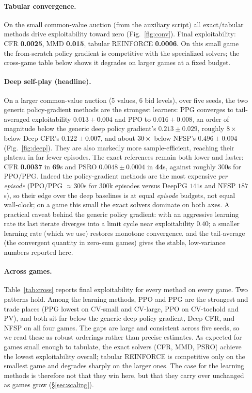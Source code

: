 \documentclass[11pt,a4paper]{article}
\begin{document}
\paragraph{Tabular convergence.} On the small common-value auction (from the
auxiliary script) all exact/tabular methods drive exploitability toward zero
(Fig.~\ref{fig:conv}). Final exploitability: CFR \textbf{0.0025}, MMD \textbf{0.015},
tabular REINFORCE \textbf{0.0006}. On this small game the from-scratch policy
gradient is competitive with the specialized solvers; the cross-game table below
shows it degrades on larger games at a fixed budget.

\paragraph{Deep self-play (headline).} On a larger common-value auction (5 values,
6 bid levels), over five seeds, the two generic policy-gradient methods are the
strongest learners: PPG converges to tail-averaged exploitability
\textbf{$0.013 \pm 0.004$} and PPO to \textbf{$0.016 \pm 0.008$}, an order of
magnitude below the generic deep policy gradient's \textbf{$0.213 \pm 0.029$},
roughly $8\times$ below Deep CFR's \textbf{$0.122 \pm 0.007$}, and about $30\times$
below NFSP's \textbf{$0.496 \pm 0.004$} (Fig.~\ref{fig:deep}). They are also markedly
more sample-efficient, reaching their plateau in far fewer episodes. The exact
references remain both lower and faster: CFR \textbf{0.0037} in \textbf{69}s and PSRO
\textbf{$0.0048 \pm 0.0004$} in \textbf{44}s, against roughly $300$s for PPO/PPG.
Indeed the policy-gradient methods are the most expensive \emph{per episode} (PPO/PPG
$\approx 300$s for $300$k episodes versus DeepPG $141$s and NFSP $187$s), so their
edge over the deep baselines is at equal \emph{episode} budgets, not equal
wall-clock; on a game this small the exact solvers dominate on both axes. A practical
caveat behind the generic policy gradient: with an aggressive learning rate its last
iterate diverges into a limit cycle near exploitability $0.40$; a smaller learning
rate (which we use) restores monotone convergence, and the tail-average (the
convergent quantity in zero-sum games) gives the stable, low-variance numbers
reported here.

\paragraph{Across games.} Table~\ref{tab:cross} reports final exploitability for
every method on every game. Two patterns hold. Among the learning methods, PPO and
PPG are the strongest and trade places (PPG lowest on CV-small and CV-large, PPO on
CV-toehold and PV), and both sit far below the generic deep policy gradient, Deep
CFR, and NFSP on all four games. The gaps are large and consistent across five
seeds, so we read these as robust orderings rather than precise estimates. As
expected for games small enough to tabulate, the exact solvers (CFR, MMD, PSRO)
achieve the lowest exploitability overall; tabular REINFORCE is competitive only on
the smallest game and degrades sharply on the larger ones. The case for the learning
methods is therefore not that they win here, but that they carry over unchanged as
games grow (\S\ref{sec:scaling}).
\end{document}
